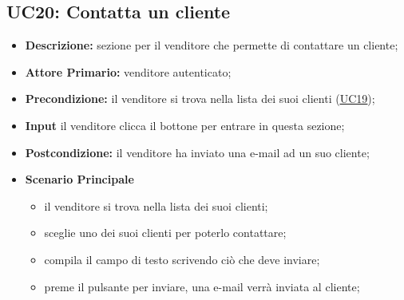         \subsection{UC20: Contatta un cliente}
        \begin{itemize}
            \item \textbf{Descrizione:} sezione per il venditore che permette di contattare un cliente;
            \item \textbf{Attore Primario:} venditore autenticato;
            \item \textbf{Precondizione:} il venditore si trova nella lista dei suoi clienti (\hyperref[sec:UC19]{\underline{UC19}});
            \item \textbf{Input} il venditore clicca il bottone per entrare in questa sezione; 
            \item \textbf{Postcondizione:} il venditore ha inviato una e-mail ad un suo cliente;
            \item \textbf{Scenario Principale}
                \begin{itemize}
                    \item il venditore si trova nella lista dei suoi clienti;
                    \item sceglie uno dei suoi clienti per poterlo contattare;
                    \item compila il campo di testo scrivendo ciò che deve inviare;
                    \item preme il pulsante per inviare, una e-mail verrà inviata al cliente;
                \end{itemize}
        \end{itemize}

